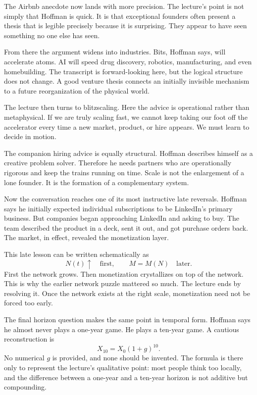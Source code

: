 The Airbnb anecdote now lands with more precision. The lecture's point is not simply that Hoffman is quick. It is that exceptional founders often present a thesis that is legible precisely because it is surprising. They appear to have seen something no one else has seen.

From there the argument widens into industries. Bits, Hoffman says, will accelerate atoms. AI will speed drug discovery, robotics, manufacturing, and even homebuilding. The transcript is forward-looking here, but the logical structure does not change. A good venture thesis connects an initially invisible mechanism to a future reorganization of the physical world.

The lecture then turns to blitzscaling. Here the advice is operational rather than metaphysical. If we are truly scaling fast, we cannot keep taking our foot off the accelerator every time a new market, product, or hire appears. We must learn to decide in motion.

The companion hiring advice is equally structural. Hoffman describes himself as a creative problem solver. Therefore he needs partners who are operationally rigorous and keep the trains running on time. Scale is not the enlargement of a lone founder. It is the formation of a complementary system.

Now the conversation reaches one of its most instructive late reversals. Hoffman says he initially expected individual subscriptions to be LinkedIn's primary business. But companies began approaching LinkedIn and asking to buy. The team described the product in a deck, sent it out, and got purchase orders back. The market, in effect, revealed the monetization layer.

This late lesson can be written schematically as
\begin{equation}
N(t)\uparrow \quad \text{first}, \qquad M=M(N) \quad \text{later}.
\end{equation}
First the network grows. Then monetization crystallizes on top of the network. This is why the earlier network puzzle mattered so much. The lecture ends by resolving it. Once the network exists at the right scale, monetization need not be forced too early.

The final horizon question makes the same point in temporal form. Hoffman says he almost never plays a one-year game. He plays a ten-year game. A cautious reconstruction is
\begin{equation}
X_{10}=X_0(1+g)^{10}.
\end{equation}
No numerical \(g\) is provided, and none should be invented. The formula is there only to represent the lecture's qualitative point: most people think too locally, and the difference between a one-year and a ten-year horizon is not additive but compounding.

